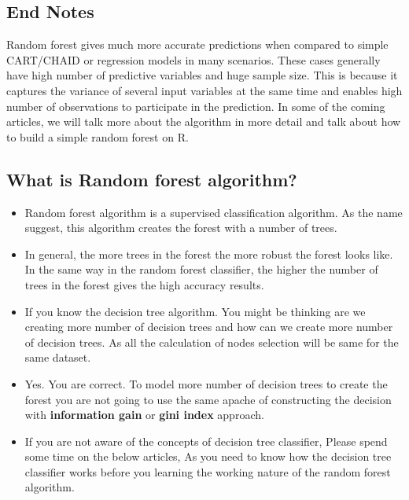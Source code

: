 

\pagestyle{fancy}
\setmarginsrb{20mm}{0mm}{20mm}{25mm}{12mm}{11mm}{0mm}{11mm}



\subsection*{End Notes}
Random forest gives much more accurate predictions when compared to simple CART/CHAID or regression models in many scenarios. These cases generally have high number of predictive variables and huge sample size. This is because it captures the variance of several input variables at the same time and enables high number of observations to participate in the prediction. In some of the coming articles, we will talk more about the algorithm in more detail and talk about how to build a simple random forest on R.


\subsection*{What is Random forest algorithm?}
\begin{itemize}
	\item Random forest algorithm is a supervised classification algorithm. As the name suggest, this algorithm creates the forest with a number of trees.
	
	\item In general, the more trees in the forest the more robust the forest looks like. In the same way in the random forest classifier, the higher the number of trees in the forest gives the high accuracy results.
	
	\item If you know the decision tree algorithm. You might be thinking are we creating more number of decision trees and how can we create more number of decision trees. As all the calculation of nodes selection will be same for the same dataset.
	
	\item Yes. You are correct. To model more number of decision trees to create the forest you are not going to use the same apache of constructing the decision with \textbf{information gain} or \textbf{gini index} approach.
	
	\item If you are not aware of the concepts of decision tree classifier, Please spend some time on the below articles, As you need to know how the decision tree classifier works before you learning the working nature of the random forest algorithm. 
	
\end{itemize}

